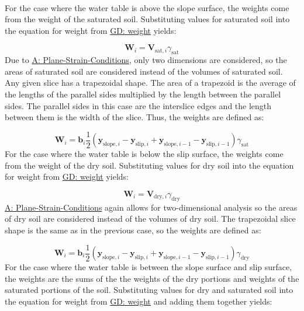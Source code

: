 \documentclass[12pt]{article}
\begin{document}
\paragraph{}
\label{GD:sliceWghtDeriv}
For the case where the water table is above the slope surface, the weights come from the weight of the saturated soil. Substituting values for saturated soil into the equation for weight from \hyperref[GD:weight]{GD: weight} yields:

\begin{displaymath}
{\mathbf{W}}_{i}={\mathbf{V}_{\text{sat},i}} {γ_{\text{sat}}}
\end{displaymath}
Due to \hyperref[assumpPSC]{A: Plane-Strain-Conditions}, only two dimensions are considered, so the areas of saturated soil are considered instead of the volumes of saturated soil. Any given slice has a trapezoidal shape. The area of a trapezoid is the average of the lengths of the parallel sides multiplied by the length between the parallel sides. The parallel sides in this case are the interslice edges and the length between them is the width of the slice. Thus, the weights are defined as:

\begin{displaymath}
{\mathbf{W}}_{i}={\mathbf{b}}_{i} \frac{1}{2} \left({\mathbf{y}_{\text{slope},i}}-{\mathbf{y}_{\text{slip},i}}+{\mathbf{y}_{\text{slope},i-1}}-{\mathbf{y}_{\text{slip},i-1}}\right) {γ_{\text{sat}}}
\end{displaymath}
For the case where the water table is below the slip surface, the weights come from the weight of the dry soil. Substituting values for dry soil into the equation for weight from \hyperref[GD:weight]{GD: weight} yields:

\begin{displaymath}
{\mathbf{W}}_{i}={\mathbf{V}_{\text{dry},i}} {γ_{\text{dry}}}
\end{displaymath}
\hyperref[assumpPSC]{A: Plane-Strain-Conditions} again allows for two-dimensional analysis so the areas of dry soil are considered instead of the volumes of dry soil. The trapezoidal slice shape is the same as in the previous case, so the weights are defined as:

\begin{displaymath}
{\mathbf{W}}_{i}={\mathbf{b}}_{i} \frac{1}{2} \left({\mathbf{y}_{\text{slope},i}}-{\mathbf{y}_{\text{slip},i}}+{\mathbf{y}_{\text{slope},i-1}}-{\mathbf{y}_{\text{slip},i-1}}\right) {γ_{\text{dry}}}
\end{displaymath}
For the case where the water table is between the slope surface and slip surface, the weights are the sums of the the weights of the dry portions and weights of the saturated portions of the soil. Substituting values for dry and saturated soil into the equation for weight from \hyperref[GD:weight]{GD: weight} and adding them together yields:
\end{document}
